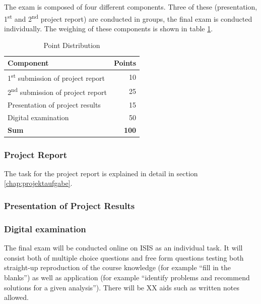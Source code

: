 \documentclass[headinclude=true]{scrartcl}
\begin{document}
The exam is composed of four different components. Three of these (presentation, 1\textsuperscript{st} and 2\textsuperscript{nd} project report) are conducted in groups, the final exam is conducted individually. The weighing of these components is shown in table \ref{tab:komponenten}.

\begin{table} \centering
 \caption{Point Distribution}
 \label{tab:komponenten}
 \begin{tabular}{lr}
  \toprule
  Component & Points \\ \midrule
  1\textsuperscript{st} submission of project report & 10 \\ 
  2\textsuperscript{nd} submission of project report & 25 \\ 
  Presentation of project results & 15 \\ 
  Digital examination & 50 \\ \midrule
  \textbf{Sum} & \textbf{100} \\ \bottomrule
 \end{tabular}
\end{table}

\subsubsection{Project Report}

The task for the project report is explained in detail in section \ref{chap:projektaufgabe}.

\subsubsection{Presentation of Project Results}


\subsubsection{Digital examination}

The final exam will be conducted online on ISIS as an individual task. It will consist both of multiple choice questions and free form questions testing both straight-up reproduction of the course knowledge (for example ``fill in the blanks'') as well as application (for example ``identify problems and recommend solutions for a given analysis''). There will be XX aids such as written notes allowed.
\end{document}

